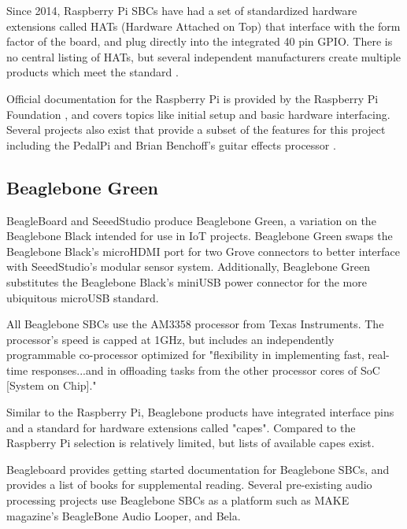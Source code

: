 \documentclass[journal,onecolumn,draftclsnofoot]{IEEEtran}
\begin{document}
Since 2014, Raspberry Pi SBCs have had a set of standardized hardware extensions called HATs (Hardware Attached on Top) that interface with the form factor of the board, and plug directly into the integrated 40 pin GPIO\cite{rpi:hats}. There is no central listing of HATs, but several independent manufacturers create multiple products which meet the standard \cite{rpi:adahats}\cite{rpi:pimeroni}\cite{rpi:pihut}.

Official documentation for the Raspberry Pi is provided by the Raspberry Pi Foundation \cite{rpi:docs}, and covers topics like initial setup and basic hardware interfacing. Several projects also exist that provide a subset of the features for this project including the PedalPi \cite{rpi:pedalpi} and Brian Benchoff's guitar effects processor \cite{rpi:benchoff}.


\subsection{Beaglebone Green} %
BeagleBoard and SeeedStudio produce Beaglebone Green, a variation on the Beaglebone Black intended for use in IoT projects. Beaglebone Green swaps the Beaglebone Black's microHDMI port for two Grove connectors to better interface with SeeedStudio's modular sensor system. Additionally, Beaglebone Green substitutes the Beaglebone Black's miniUSB power connector for the more ubiquitous microUSB standard.\cite{bbg:info}

All Beaglebone SBCs use the AM3358 processor from Texas Instruments. The processor's speed is capped at 1GHz, but includes an independently programmable co-processor optimized for "flexibility in implementing fast, real-time responses...and in offloading tasks from the other processor cores of SoC [System on Chip]."\cite{bbg:proc}

Similar to the Raspberry Pi, Beaglebone products have integrated interface pins and a standard for hardware extensions called "capes". Compared to the Raspberry Pi selection is relatively limited, but lists of available capes exist\cite{bbg:capes}.

Beagleboard provides getting started documentation for Beaglebone SBCs, and provides a list of books for supplemental reading\cite{bbg:docs}. Several pre-existing audio processing projects use Beaglebone SBCs as a platform such as MAKE magazine's BeagleBone Audio Looper\cite{bbg:looper}, and Bela\cite{bbg:bela}.
\end{document}
